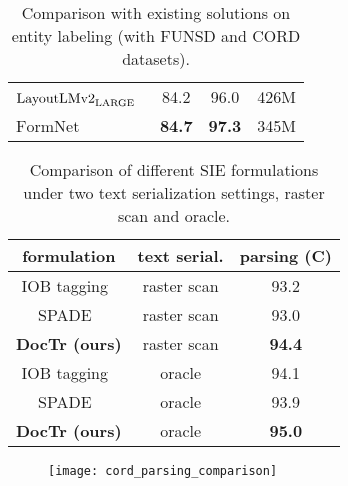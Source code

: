 \begin{table}[t]
{\begin{tabular}{lccc}
        $\textrm{LayoutLMv2}_{\rm LARGE}$~\cite{xu2021layoutlmv2} & 84.2                  & 96.0             & 426M  \\
         $\textrm{FormNet}$~\cite{lee2022formnet}                 & \bf{84.7}      & \bf{97.3} & 345M \\
\end{tabular}}
    \vspace{-0.7em}
    \caption{Comparison with existing solutions on entity labeling (with FUNSD and CORD datasets).}
    \label{tab:entity_labeling} \vspace{-1em}
\end{table}

\begin{table}[!t]
    \centering
    \begin{tabular}{ccc}
    \bf formulation                        & \bf text serial. & \bf parsing (C) \\
    \midrule
    IOB tagging~\cite{ramshaw1999text}   & raster scan      & 93.2  \\
    SPADE~\cite{hwang2020spatial}        & raster scan      & 93.0  \\
    \bf DocTr (ours)                     & raster scan      & \bf 94.4  \\
    \cmidrule{1-3}
    IOB tagging~\cite{ramshaw1999text}   & oracle           & 94.1  \\
    SPADE~\cite{hwang2020spatial}        & oracle           & 93.9  \\
    \bf DocTr (ours)                     & oracle           & \bf 95.0  \\
    \end{tabular}
    \vspace{-0.7em}
    \caption{Comparison of different SIE formulations under two text serialization settings, raster scan and oracle.}
    \label{tab:formulation} \vspace{-1em}
\end{table}

\begin{figure}[t]
  \centering
  \texttt{[image: cord\_parsing\_comparison]}
  \vspace{-1.5em}
  \label{fig:cord_parsing_comparison} \vspace{-1em}
\end{figure}


